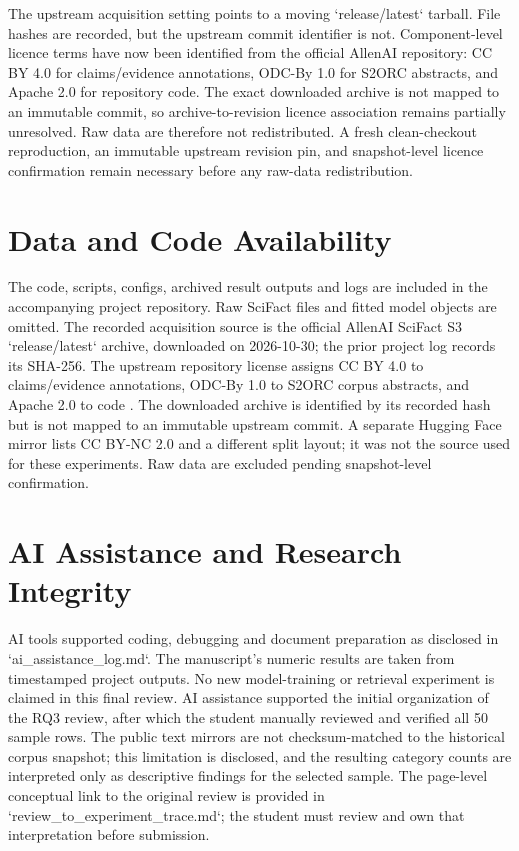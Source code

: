 \documentclass[10pt]{article}
\begin{document}
The upstream acquisition setting points to a moving `release/latest` tarball. File hashes are recorded, but the upstream commit identifier is not. Component-level licence terms have now been identified from the official AllenAI repository: CC BY 4.0 for claims/evidence annotations, ODC-By 1.0 for S2ORC abstracts, and Apache 2.0 for repository code. The exact downloaded archive is not mapped to an immutable commit, so archive-to-revision licence association remains partially unresolved. Raw data are therefore not redistributed. A fresh clean-checkout reproduction, an immutable upstream revision pin, and snapshot-level licence confirmation remain necessary before any raw-data redistribution.

\section*{Data and Code Availability}
The code, scripts, configs, archived result outputs and logs are included in the accompanying project repository. Raw SciFact files and fitted model objects are omitted. The recorded acquisition source is the official AllenAI SciFact S3 `release/latest` archive, downloaded on 2026-10-30; the prior project log records its SHA-256. The upstream repository license assigns CC BY 4.0 to claims/evidence annotations, ODC-By 1.0 to S2ORC corpus abstracts, and Apache 2.0 to code \citep{allenai2026scifactlicense}. The downloaded archive is identified by its recorded hash but is not mapped to an immutable upstream commit. A separate Hugging Face mirror lists CC BY-NC 2.0 and a different split layout; it was not the source used for these experiments. Raw data are excluded pending snapshot-level confirmation.

\section*{AI Assistance and Research Integrity}
AI tools supported coding, debugging and document preparation as disclosed in `ai_assistance_log.md`. The manuscript's numeric results are taken from timestamped project outputs. No new model-training or retrieval experiment is claimed in this final review. AI assistance supported the initial organization of the RQ3 review, after which the student manually reviewed and verified all 50 sample rows. The public text mirrors are not checksum-matched to the historical corpus snapshot; this limitation is disclosed, and the resulting category counts are interpreted only as descriptive findings for the selected sample. The page-level conceptual link to the original review is provided in `review_to_experiment_trace.md`; the student must review and own that interpretation before submission.

\balance

\end{document}
